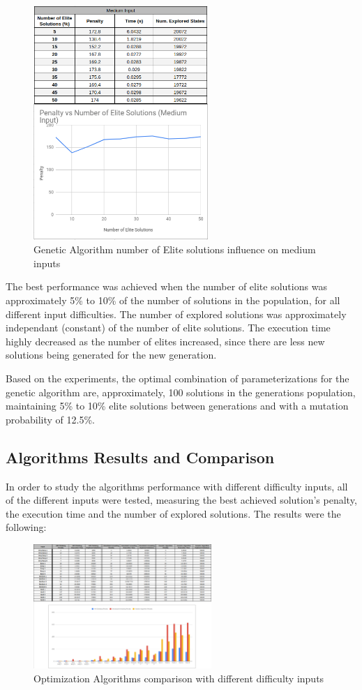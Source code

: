 \documentclass[conference]{IEEEtran}
\begin{document}
\begin{figure}[H]
    \centerline{\includegraphics[width=250px]{elite_medium.png}}
    \caption{Genetic Algorithm number of Elite solutions influence on medium inputs}
\end{figure}

The best performance was achieved when the number of elite solutions was approximately 5\% to 10\% of the number of solutions in the population, for all different input difficulties. The number of explored solutions was approximately independant (constant) of the number of elite solutions. The execution time highly decreased as the number of elites increased, since there are less new solutions being generated for the new generation.

Based on the experiments, the optimal combination of parameterizations for the genetic algorithm are, approximately, 100 solutions in the generations population, maintaining 5\% to 10\% elite solutions between generations and with a mutation probability of 12.5\%.

\subsection{Algorithms Results and Comparison}

In order to study the algorithms performance with different difficulty inputs, all of the different inputs were tested, measuring the best achieved solution's penalty, the execution time and the number of explored solutions. The results were the following:  

\begin{figure}[H]
    \centerline{\includegraphics[width=255px]{comparison.png}}
    \caption{Optimization Algorithms comparison with different difficulty inputs}
\end{figure}
\end{document}
